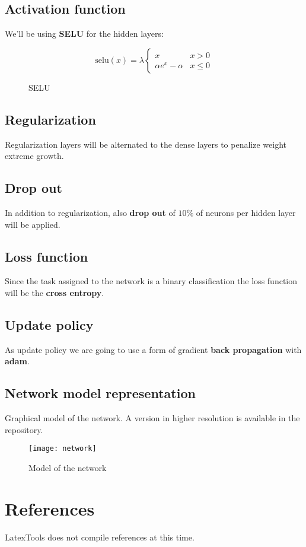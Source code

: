 \section{Activation function}
We'll be using \textbf{SELU} for the hidden layers:

\begin{figure}
	\[
		\text{selu}(x) = \lambda \begin{cases}
			x                 & x > 0    \\
			\alpha e^x-\alpha & x \leq 0
		\end{cases}
	\]
	\caption{SELU}
\end{figure}

\section{Regularization}
Regularization layers will be alternated to the dense layers to penalize weight extreme growth.

\section{Drop out}
In addition to regularization, also \textbf{drop out} of \(10\% \) of neurons per hidden layer will be applied.

\section{Loss function}
Since the task assigned to the network is a binary classification the loss function will be the \textbf{cross entropy}.

\section{Update policy}
As update policy we are going to use a form of gradient \textbf{back propagation} with \textbf{adam}.

\section{Network model representation}
Graphical model of the network. A version in higher resolution is available in the repository.
\begin{figure}
	\texttt{[image: network]}
	\caption{Model of the network}
\end{figure}



\chapter{References}
LatexTools does not compile references at this time.

